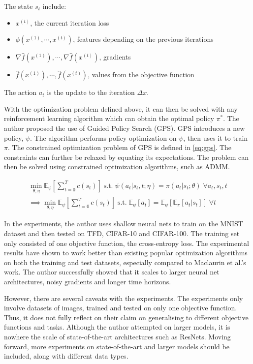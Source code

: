 \documentclass{article}
\begin{document}
The state $s_t$ include:
\begin{itemize}
    \item $x^{(t)}$, the current iteration loss
    \item $\phi(x^{(1)}, \cdots, x^{(t)})$, features depending on the previous iterations
    \item $\nabla \hat{f}(x^{(1)}), \cdots, \nabla \hat{f}(x^{(t)})$, gradients
    \item $\hat{f}(x^{(1)}), \cdots, \hat{f}(x^{(t)})$, values from the objective function
\end{itemize}

The action $a_t$ is the update to the iteration $\Delta x$.

With the optimization problem defined above, it can then be solved with any reinforcement learning algorithm which can obtain the optimal policy $\pi^*$. The author proposed the use of Guided Policy Search (GPS). GPS introduces a new policy, $\psi$. The algorithm performs policy optimization on $\psi$, then uses it to train $\pi$. The constrained optimization problem of GPS is defined in \cref{eq:gps}. The constraints can further be relaxed by equating its expectations. The problem can then be solved using constrained optimization algorithms, such as ADMM.

\begin{equation}
    \begin{split}
        \min_{\theta, \eta} \mathbb{E}_{\psi} [\sum_{t=0}^{T} c(s_t)] \; \text{s.t.} \; \psi (a_t | s_t, t; \eta) = \pi (a_t | s_t; \theta) \; \forall a_t, s_t, t\\
        \implies \min_{\theta, \eta} \mathbb{E}_{\psi} [\sum_{t=0}^{T} c(s_t)] \; \text{s.t.} \; \mathbb{E}_{\psi} [a_t] =  \mathbb{E}_{\psi} [ \mathbb{E}_{\pi} [a_t | s_t ]]\; \forall t
    \end{split}
    \label{eq:gps}
\end{equation}

In the experiments, the author uses shallow neural nets to train on the MNIST dataset and then tested on TFD, CIFAR-10 and CIFAR-100. The training set only consisted of one objective function, the cross-entropy loss. The experimental results have shown to work better than existing popular optimization algorithms on both the training and test datasets, especially compared to Maclaurin et al.'s work. The author successfully showed that it scales to larger neural net architectures, noisy gradients and longer time horizons.

However, there are several caveats with the experiments. The experiments only involve datasets of images, trained and tested on only one objective function. Thus, it does not fully reflect on their claim on generalising to different objective functions and tasks. Although the author attempted on larger models, it is nowhere the scale of state-of-the-art architectures such as ResNets. Moving forward, more experiments on state-of-the-art and larger models should be included, along with different data types.
\end{document}
